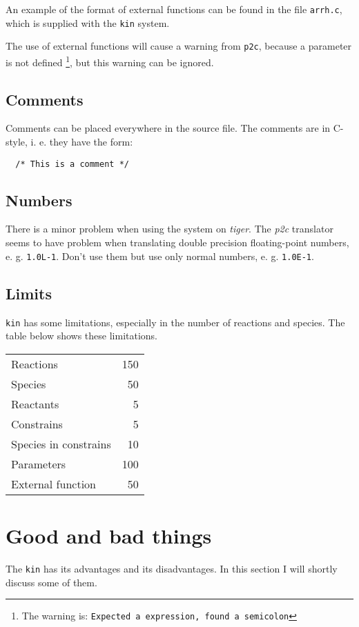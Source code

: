 An example of the format of external functions can be found in the file
{\tt arrh.c}, which is supplied with the {\tt kin} system.

The use of external functions will cause a warning from {\tt p2c}, because
a parameter is not defined {\footnote{The warning is: {\tt Expected a 
expression, found a semicolon}}}, but this warning can be ignored. 

\subsection{Comments}
Comments can be placed everywhere in the source file. The comments are in C-
style, i. e. they have the form:

\begin{verbatim}
  /* This is a comment */
\end{verbatim}

\subsection{Numbers}
There is a minor problem when using the system on {\em tiger}. The   
{\em p2c} translator seems to have problem when translating double
precision floating-point numbers, e. g. {\tt 1.0L-1}. Don't use
them but use only normal numbers, e. g. {\tt 1.0E-1}.

\subsection{Limits}
{\tt kin} has some limitations, especially in the number of reactions and species. The table below shows
these limitations.
\begin{tabular}{lr}
 Reactions  & 150 \\  
 Species    &  50 \\
 Reactants  &   5 \\
 Constrains &   5 \\
 Species in constrains & 10 \\
 Parameters & 100 \\
 External function & 50 
\end{tabular}

\section{Good and bad things}
The {\tt kin} has its advantages and its disadvantages. In this section I will shortly discuss some
of them.


